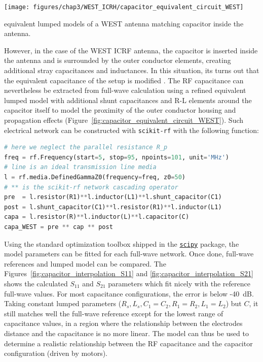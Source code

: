 {\begin{marginfigure}
	\centering
	\texttt{[image: figures/chap3/WEST\_ICRH/capacitor\_equivalent\_circuit\_WEST]}
	\caption{equivalent lumped models of a WEST antenna matching capacitor inside the antenna.}
	\label{fig:capacitor_equivalent_circuit_WEST}	  
\end{marginfigure}

However, in the case of the WEST ICRF antenna, the capacitor is inserted inside the antenna and is surrounded by the outer conductor elements, creating additional stray capacitances and inductances. In this situation, its turns out that the equivalent capacitance of the setup is modified . The RF capacitance can nevertheless be extracted from full-wave calculation using a refined equivalent lumped model with additional shunt capacitances and R-L elements around the capacitor itself to model the proximity of the outer conductor housing and propagation effects (Figure~\ref{fig:capacitor_equivalent_circuit_WEST}). Such electrical network can be constructed with \texttt{scikit-rf} with the following function:

\begin{lstlisting}[language=Python]
# here we neglect the parallel resistance R_p
freq = rf.Frequency(start=5, stop=95, npoints=101, unit='MHz')
# line is an ideal transmission line media
l = rf.media.DefinedGammaZ0(frequency=freq, z0=50)  
# ** is the scikit-rf network cascading operator
pre  = l.resistor(R1)**l.inductor(L1)**l.shunt_capacitor(C1)
post = l.shunt_capacitor(C1)**l.resistor(R1)**l.inductor(L1)
capa = l.resistor(R)**l.inductor(L)**l.capacitor(C)
capa_WEST = pre ** cap ** post  
\end{lstlisting}

Using the standard optimization toolbox shipped in the \href{https://www.scipy.org/}{\texttt{scipy}} package, the model parameters can be fitted for each full-wave network. Once done, full-wave references and lumped model can be compared. The Figures~\ref{fig:capacitor_interpolation_S11} and \ref{fig:capacitor_interpolation_S21} shows the calculated $S_{11}$ and $S_{21}$ parameters which fit nicely with the reference full-wave values. For most capacitance configurations, the error is below -40~dB. Taking constant lumped parameters ($R_s, L_s, C_1=C_2, R_1=R_2, L_1=L_2$) but $C$, it still matches well the full-wave reference except for the lowest range of capacitance values, in a region where the relationship between the electrodes distance and the capacitance is no more linear. The model can thus be used to determine a realistic relationship between the RF capacitance and the capacitor configuration (driven by motors).

}
